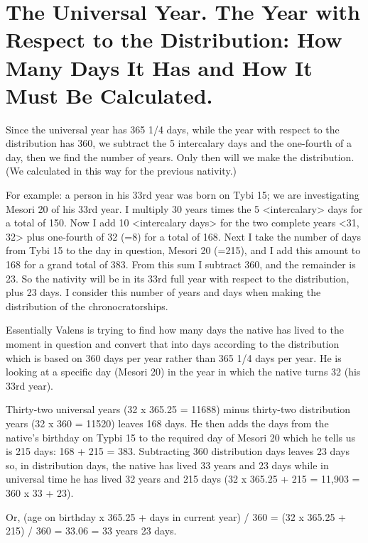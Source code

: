 \section{The Universal Year. The Year with Respect to the Distribution: How Many Days It Has and How It Must Be Calculated.}
Since the universal year has 365 1/4 days, while the year with respect to the distribution has 360, we subtract the 5 intercalary days and the one-fourth of a day, then we find the number of years. Only then will we make the distribution. (We calculated in this way for the previous nativity.) 

For example: a person in his 33rd year was born on Tybi 15; we are investigating Mesori 20 of his 33rd year. I multiply 30 years
times the 5 <intercalary> days for a total of 150. Now I add 10 <intercalary days> for the two complete years <31, 32> plus one-fourth of 32 (=8) for a total of 168. Next I take the number of days from Tybi 15 to the day in question, Mesori 20 (=215), and I add this amount to 168 for a grand total of 383. From this sum I subtract 360, and the remainder is 23. So the nativity will be in its 33rd full year with respect to the distribution, plus 23 days. I consider this number of years and days when making the distribution of the chronocratorships.

\begin{mdframed}[backgroundcolor=cyan!5]
\scriptsize
Essentially Valens is trying to find how many days the native has lived to the moment in question and convert that into days according to the distribution which is based on 360 days per year rather than 365 1/4 days per year. He is looking at a specific day (Mesori 20) in the year in which the native turns 32 (his 33rd year).

Thirty-two universal years (32 x 365.25 = 11688) minus thirty-two distribution years (32 x 360 = 11520) leaves 168 days. He then adds the days from the native's birthday on Typbi 15 to the required day of Mesori 20 which he tells us is 215 days: 168 + 215 = 383. Subtracting 360 distribution days leaves 23 days so, in distribution days, the native has lived 33 years and 23 days while in universal time he has lived 32 years and 215 days (32 x 365.25 + 215 = 11,903 = 360 x 33 + 23). 

Or, (age on birthday x 365.25 + days in current year) / 360 = (32 x 365.25 + 215) / 360 = 33.06 = 33 years 23 days.

\end{mdframed}

\newpage